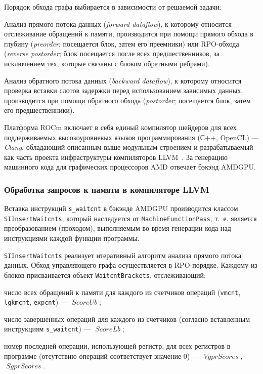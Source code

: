 \documentclass[a4paper,14pt]{extarticle}
\newcommand{\var}[1]{\mathop{\mathit{#1}}}
\begin{document}
{Порядок обхода графа выбирается в зависимости от решаемой задачи:
\begin{ul}
\item Анализ прямого потока данных (\textit{forward dataflow}), к которому относится отслеживание обращений
  к памяти, производится при помощи прямого обхода в глубину (\textit{preorder}; посещается блок, затем его преемники) или RPO-обхода (\textit{reverse postorder}; блок посещается после всех предшественников, за исключением тех, которые связаны с блоком обратными ребрами).

\item Анализ обратного потока данных (\textit{backward dataflow}), к которому относится проверка вставки
слотов задержки перед использованием зависимых данных, производится при помощи обратного обхода
(\textit{postorder}; посещается блок, затем его предшественники).
\end{ul}

Платформа ROCm включает в себя единый компилятор шейдеров для всех поддерживаемых
высокоуровневых языков программирования (С++, OpenCL) — \textit{Clang}, обладающий
описанным выше модульным строением и разрабатываемый как часть проекта
инфраструктуры компиляторов LLVM~\cite{llvm-12}.
За генерацию машинного кода для графических процессоров AMD отвечает бэкэнд AMDGPU.

\subsubsection{Обработка запросов к памяти в компиляторе LLVM}
\label{section:gcn-waitcnt-llvm}

Вставка инструкций \verb|s_waitcnt| в бэкэнде AMDGPU производится классом \verb|SIInsertWaitcnts|,
который наследуется от \verb|MachineFunctionPass|, т.~е. является преобразованием
(проходом), выполняемым во время генерации кода над инструкциями каждой функции программы.

\verb|SIInsertWaitcnts| реализует итеративный алгоритм анализа прямого потока данных.
Обход управляющего графа осуществляется в RPO-порядке. Каждому из блоков присваивается
объект \verb|WaitcntBrackets|, отслеживающий:
\begin{ul}
\item число всех обращений к памяти для каждого из счетчиков операций
  (\verb|vmcnt|, \verb|lgkmcnt|, \verb|expcnt|) — $\var{ScoreUb}$;
\item число завершенных операций для каждого из счетчиков (согласно
  вставленным инструкциям \verb|s_waitcnt|) — $\var{ScoreLb}$;
\item номер последней операции, использующей регистр, для всех регистров
  в программе (отсутствию операций соответствует значение $0$) — $\var{VgprScores}$, $\var{SgprScores}$.
\end{ul}

}
\end{document}
